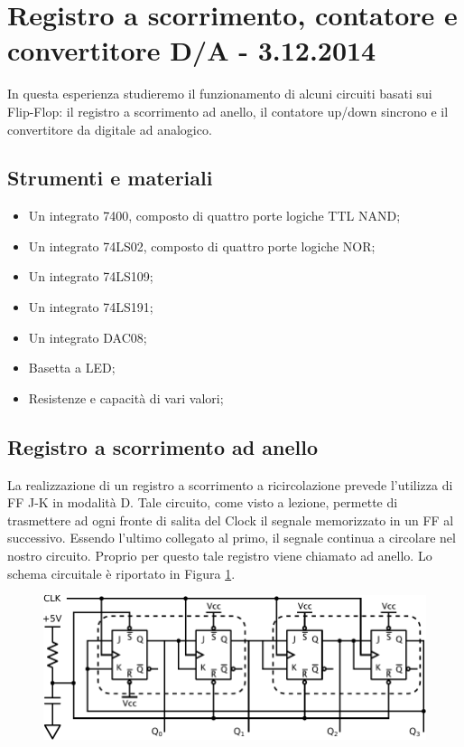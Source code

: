 \section{Registro a scorrimento, contatore e convertitore D/A - 3.12.2014}

\label{rel12:label}

In questa esperienza studieremo il funzionamento di alcuni circuiti basati sui Flip-Flop: il registro a scorrimento ad anello, il contatore up/down sincrono e il convertitore da digitale ad analogico.

\subsection*{Strumenti e materiali}

\begin{itemize} [noitemsep]
	\item Un integrato 7400, composto di quattro porte logiche TTL NAND; %
	\item Un integrato 74LS02, composto di quattro porte logiche NOR;
	\item Un integrato 74LS109;
	\item Un integrato 74LS191;
	\item Un integrato DAC08;	
	\item Basetta a LED;		
	\item Resistenze e capacità di vari valori;
\end{itemize}

\subsection{Registro a scorrimento ad anello}

La realizzazione di un registro a scorrimento a ricircolazione prevede l'utilizza di FF J-K in modalità D. Tale circuito, come visto a lezione, permette di trasmettere ad ogni fronte di salita del Clock il segnale memorizzato in un FF al successivo. Essendo l'ultimo collegato al primo, il segnale continua a circolare nel nostro circuito. Proprio per questo tale registro viene chiamato ad anello. Lo schema circuitale è riportato in Figura \ref{cir12:shift}.

\begin{figure}[htpc]
\centering
	\includegraphics[width=.85\textwidth]{../E12/latex/shift_register.pdf}
	\caption{}
	\label{cir12:shift}
\end{figure}

